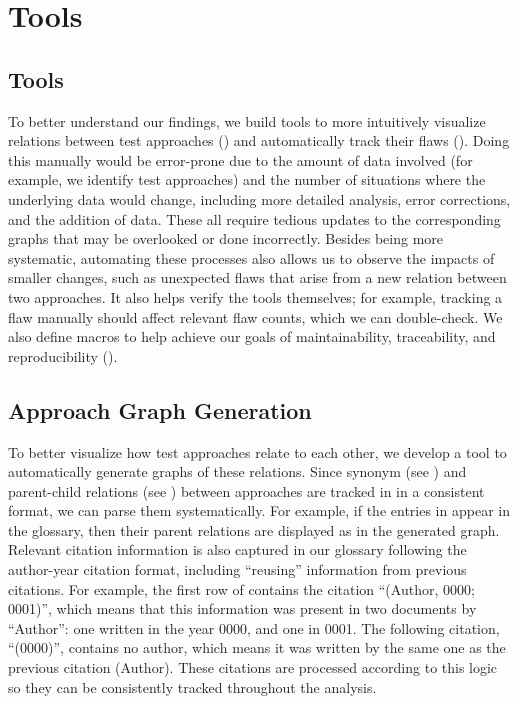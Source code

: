 \ifnotpaper
    \section{Tools}
\else
    \subsection{Tools}
\fi
\label{tools}

\ifnotpaper
    To better understand our findings, we build tools to more intuitively
    visualize relations between test approaches () and
    automatically track their flaws (). Doing
    this manually would be error-prone due to the amount of data involved (for
    example, we identify \approachCount{} test approaches) and the number of
    situations where the underlying data would change, including more detailed
    analysis, error corrections, and the addition of data. These all require
    tedious updates to the corresponding graphs that may be overlooked or done
    incorrectly. Besides being more systematic, automating these processes also
    allows us to observe the impacts of smaller changes, such as unexpected
    flaws that arise from a new relation between two approaches. It
    also helps verify the tools themselves; for example, tracking a flaw
    manually should affect relevant flaw counts, which we can double-check.
    We also define macros to help achieve our goals of
    maintainability, traceability, and reproducibility ().

    \subsection{Approach Graph Generation}
    \label{graph-gen}
\fi

To better visualize how test approaches relate to each other, we
develop a tool to automatically generate graphs of these relations.
\ifnotpaper Since synonym (see ) and parent-child relations
    (see ) between approaches are tracked in
    \ourApproachGlossary{} in a consistent format, we can parse them
    systematically. For example, if the entries in 
    appear in the glossary, then their parent relations are displayed as
     in the generated graph. Relevant citation
    information is also captured in our glossary following the author-year
    citation format, including ``reusing'' information from previous
    citations. For example, the first row of 
    contains the citation ``(Author, 0000; 0001)'', which means that this
    information was present in two documents by ``Author'': one written in
    the year 0000, and one in 0001. The following citation, ``(0000)'',
    contains no author, which means it was written by the same one as the
    previous citation (Author). These citations are processed according to this
    logic  so they can be
    consistently tracked throughout the analysis.

